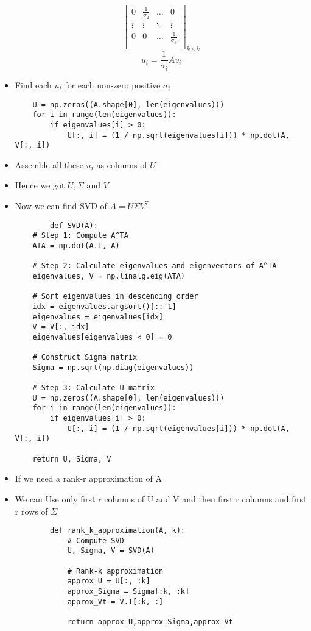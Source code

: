 \documentclass{book}
\begin{document}
\begin{itemize}
$$\begin{bmatrix}
		0& \frac{1}{\sigma_2} & \dots & 0\\
		\vdots & \vdots & \ddots & \vdots\\
		0 & 0 & \dots & \frac{1}{\sigma_k}\\
	\end{bmatrix}_{k\times k}
	$$
	$$
	u_i=\frac{1}{\sigma_i}A v_i
	$$
	\item Find each $u_i$ for each non-zero positive $\sigma_i$
	\subitem 
	\begin{verbatim}
	U = np.zeros((A.shape[0], len(eigenvalues)))
	for i in range(len(eigenvalues)):
        if eigenvalues[i] > 0:
            U[:, i] = (1 / np.sqrt(eigenvalues[i])) * np.dot(A, V[:, i])
	\end{verbatim}
	\item Assemble all these $u_i$ as columns of $U$
	\item Hence we got $U,\Sigma$ and $V$
	\item Now we can find SVD of $A=U\Sigma V^T$
	\subitem
	\begin{verbatim}
		def SVD(A):
    # Step 1: Compute A^TA
    ATA = np.dot(A.T, A)
    
    # Step 2: Calculate eigenvalues and eigenvectors of A^TA
    eigenvalues, V = np.linalg.eig(ATA)
    
    # Sort eigenvalues in descending order
    idx = eigenvalues.argsort()[::-1]
    eigenvalues = eigenvalues[idx]
    V = V[:, idx]
    eigenvalues[eigenvalues < 0] = 0

    # Construct Sigma matrix
    Sigma = np.sqrt(np.diag(eigenvalues))
    
    # Step 3: Calculate U matrix
    U = np.zeros((A.shape[0], len(eigenvalues)))
    for i in range(len(eigenvalues)):
        if eigenvalues[i] > 0:
            U[:, i] = (1 / np.sqrt(eigenvalues[i])) * np.dot(A, V[:, i])
    
    return U, Sigma, V
	\end{verbatim} 
	\item If we need a rank-r approximation of A
	\item We can Use only first r columns of U and V and then first r columns and first r rows of $\Sigma$
	\subitem
	\begin{verbatim}
		def rank_k_approximation(A, k):
			# Compute SVD
			U, Sigma, V = SVD(A)
			
			# Rank-k approximation
			approx_U = U[:, :k]
			approx_Sigma = Sigma[:k, :k]
			approx_Vt = V.T[:k, :]
	
			return approx_U,approx_Sigma,approx_Vt
	\end{verbatim} 
\end{itemize}
\end{document}
